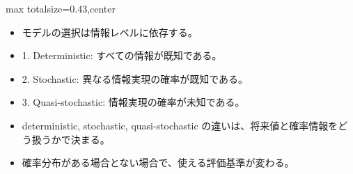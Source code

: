 \clearpage
{}
\begin{minipage}[t]{0.405\textwidth}
\begin{adjustbox}{max totalsize={\textwidth}{0.43\textheight},center}
\begin{minipage}{\textwidth}\scriptsize
{}\begin{itemize}
\item モデルの選択は情報レベルに依存する。
\item 1. Deterministic: すべての情報が既知である。
\item 2. Stochastic: 異なる情報実現の確率が既知である。
\item 3. Quasi-stochastic: 情報実現の確率が未知である。
\end{itemize}\begin{itemize}
\item deterministic, stochastic, quasi-stochastic の違いは、将来値と確率情報をどう扱うかで決まる。
\item 確率分布がある場合とない場合で、使える評価基準が変わる。
\end{itemize}
\end{minipage}
\end{adjustbox}
\end{minipage}\hfill

